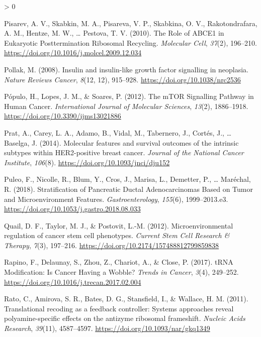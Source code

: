 \documentclass[
  12pt,
  openany]{book}
\newlength{\cslhangindent}
\newenvironment{CSLReferences}[2] %
 {%
  \setlength{\parindent}{0pt}
  \ifodd #1 \everypar{\setlength{\hangindent}{\cslhangindent}}\ignorespaces\fi
  \ifnum #2 > 0
  \setlength{\parskip}{#2\baselineskip}
  \fi
 }%
 {}
\begin{document}
\begin{CSLReferences}{1}{0}
\leavevmode\hypertarget{ref-Pisarev2010}{}%
Pisarev, A. V., Skabkin, M. A., Pisareva, V. P., Skabkina, O. V., Rakotondrafara, A. M., Hentze, M. W., \ldots{} Pestova, T. V. (2010). The {Role} of {ABCE1} in {Eukaryotic Posttermination Ribosomal Recycling}. \emph{Molecular Cell}, \emph{37}(2), 196--210. \url{https://doi.org/10.1016/j.molcel.2009.12.034}

\leavevmode\hypertarget{ref-Pollak2008}{}%
Pollak, M. (2008). Insulin and insulin-like growth factor signalling in neoplasia. \emph{Nature Reviews Cancer}, \emph{8}(12, 12), 915--928. \url{https://doi.org/10.1038/nrc2536}

\leavevmode\hypertarget{ref-Populo2012}{}%
Pópulo, H., Lopes, J. M., \& Soares, P. (2012). The {mTOR Signalling Pathway} in {Human Cancer}. \emph{International Journal of Molecular Sciences}, \emph{13}(2), 1886--1918. \url{https://doi.org/10.3390/ijms13021886}

\leavevmode\hypertarget{ref-Prat2014}{}%
Prat, A., Carey, L. A., Adamo, B., Vidal, M., Tabernero, J., Cortés, J., \ldots{} Baselga, J. (2014). Molecular features and survival outcomes of the intrinsic subtypes within {HER2}-positive breast cancer. \emph{Journal of the National Cancer Institute}, \emph{106}(8). \url{https://doi.org/10.1093/jnci/dju152}

\leavevmode\hypertarget{ref-Puleo2018}{}%
Puleo, F., Nicolle, R., Blum, Y., Cros, J., Marisa, L., Demetter, P., \ldots{} Maréchal, R. (2018). Stratification of {Pancreatic Ductal Adenocarcinomas Based} on {Tumor} and {Microenvironment Features}. \emph{Gastroenterology}, \emph{155}(6), 1999--2013.e3. \url{https://doi.org/10.1053/j.gastro.2018.08.033}

\leavevmode\hypertarget{ref-Quail2012}{}%
Quail, D. F., Taylor, M. J., \& Postovit, L.-M. (2012). Microenvironmental regulation of cancer stem cell phenotypes. \emph{Current Stem Cell Research \& Therapy}, \emph{7}(3), 197--216. \url{https://doi.org/10.2174/157488812799859838}

\leavevmode\hypertarget{ref-Rapino2017}{}%
Rapino, F., Delaunay, S., Zhou, Z., Chariot, A., \& Close, P. (2017). {tRNA Modification}: {Is Cancer Having} a {Wobble}? \emph{Trends in Cancer}, \emph{3}(4), 249--252. \url{https://doi.org/10.1016/j.trecan.2017.02.004}

\leavevmode\hypertarget{ref-Rato2011}{}%
Rato, C., Amirova, S. R., Bates, D. G., Stansfield, I., \& Wallace, H. M. (2011). Translational recoding as a feedback controller: Systems approaches reveal polyamine-specific effects on the antizyme ribosomal frameshift. \emph{Nucleic Acids Research}, \emph{39}(11), 4587--4597. \url{https://doi.org/10.1093/nar/gkq1349}


\end{CSLReferences}
\end{document}
